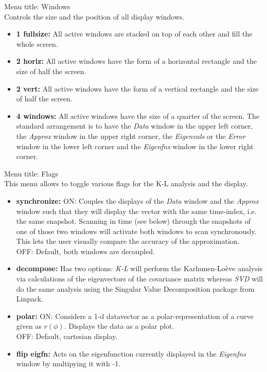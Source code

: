 \begin{description}
\item{Menu title: {\large  Windows}}\\
Controls the size and the position of all display windows.
\begin{itemize}
\item{\bf 1 fullsize:} 
	All active windows are stacked on top of each other and 
	fill the whole screen. 
\item{\bf 2 horiz:} 
	All active windows have the form of a horizontal rectangle and the size 
	of half the screen.
\item{\bf 2 vert:} 
	All active windows have the form of a vertical rectangle and the size 
	of half the screen.
\item{\bf 4 windows:} 
	All active windows have the size of  a quarter of the screen. 
	The standard arrangement is to have the {\sl Data} window in the upper
	left corner, the {\sl Approx} window in the upper right corner,
	the {\sl Eigenvals} or the {\sl Error} window in the lower left corner
	and the {\sl Eigenfns} window in the lower right corner.
\end{itemize}

\item{Menu title: {\large  Flags}}\\
This menu allows to toggle various flags for the K-L analysis and the display.
\begin{itemize}
\item{\bf synchronize:} 
	ON: Couples the displays of the {\sl Data} window and the {\sl Approx}
	window such that they will display the vector with the same time-index,
	i.e. the same snapshot. Scanning in time (see below) through the 
	snapshots of one of those two windows will activate both windows to 
	scan synchronously.
	This lets the user visually compare the accuracy of the approximation.\\
	OFF: Default, both windows are decoupled.
\item{\bf decompose:} 
	Has two options: {\sl K-L} will perform the Karhunen-Lo\`{e}ve analysis via 
	calculations of the eigenvectors of the covariance matrix whereas
	{\sl SVD} will do the same analysis using the Singular Value Decomposition
	package from Linpack.  
\item{\bf polar:} 
	ON: Considers a 1-d datavector as a polar-representation of a curve 
	given as $r(\phi)$. Displays the data as a polar plot.\\
	OFF: Default, cartesian display.
\item{\bf flip eigfn:} 
	Acts on the eigenfunction currently displayed in the {\sl Eigenfns} window by
	multipying it with -1.
\end{itemize}


\end{description}
